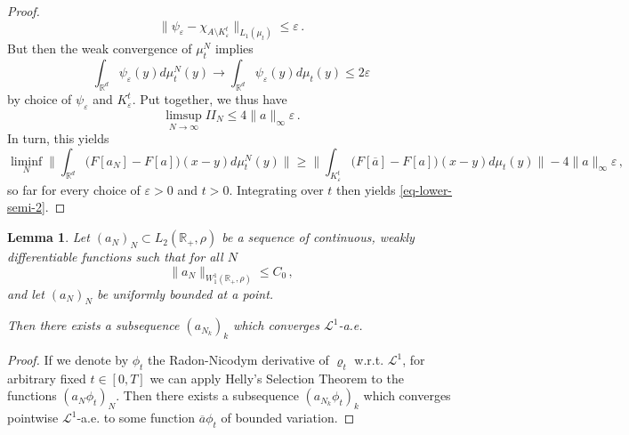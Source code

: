 \documentclass[A4paper,11pt]{article}
\newtheorem{lemma}[theorem]{Lemma}
\theoremstyle{definition}
\newcommand{\R}{\mathbb{R}}
\newcommand{\cl}{\mathcal{L}}
\begin{document}
\begin{proof}
\begin{equation*}
		\|\psi_\varepsilon-\chi_{A\setminus K_\varepsilon^t}\|_{L_1(\mu_t)}\leq\varepsilon\,.
	\end{equation*}
	But then the weak convergence of $\mu_t^N$ implies
	\begin{equation*}
		\int_{\R^d}\psi_\varepsilon(y)d\mu_t^N(y)
			\longrightarrow\int_{\R^d}\psi_\varepsilon(y)d\mu_t(y)\leq 2\varepsilon
	\end{equation*}
	by choice of $\psi_\varepsilon$ and $K_\varepsilon^t$. Put together, we thus have
	\begin{equation*}
		\limsup_{N\rightarrow\infty}II_N\leq 4\|a\|_\infty\varepsilon\,.
	\end{equation*}
	In turn, this yields
	\begin{equation*}
		\liminf_N\Biggl\|\int_{\R^d}\bigl(F[a_N]-F[a]\bigr)(x-y)d\mu_t^N(y)\Biggr\|
			\geq\Biggl\|\int_{K_\varepsilon^t}\bigl(F[\overline a]-F[a]\bigr)(x-y)d\mu_t(y)\Biggr\|
				-4\|a\|_\infty\varepsilon\,,
	\end{equation*}
	so far for every choice of $\varepsilon>0$ and $t>0$. Integrating over $t$ then yields \eqref{eq-lower-semi-2}.
\end{proof}


\begin{lemma}\label{lemma-semicontinuous-2}
	Let $(a_N)_N\subset L_2(\R_+,\rho)$ be a sequence of continuous, weakly differentiable functions such that for all
	$N$
	\[
		\|a_N\|_{W^1_1(\R_+,\rho)}\leq C_0\,,
	\]
	and let $(a_N)_N$ be uniformly bounded at a point.
	
	Then there exists a subsequence $(a_{N_k})_k$ which converges $\cl^1$-a.e.
\end{lemma}

\begin{proof}
	If we denote by $\phi_t$ the Radon-Nicodym derivative of $\varrho_t$ w.r.t. $\cl^1$, for arbitrary fixed
	$t\in [0,T]$ we can apply Helly's Selection Theorem to the functions $(a_N\phi_t)_N$. Then there exists a
	subsequence $(a_{N_k}\phi_t)_k$ which converges pointwise $\cl^1$-a.e. to some
	function $\overline a\phi_t$ of bounded variation.
\end{proof}
\end{document}
